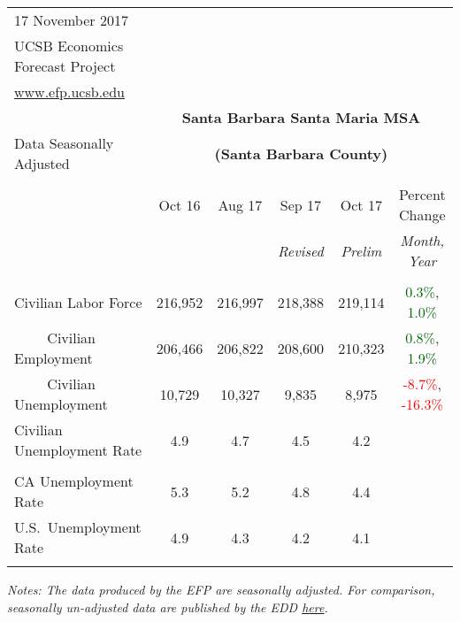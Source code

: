 \documentclass[12pt]{article}
\begin{document}
\begin{table}
\begin{tabular}{|l|c|c|c|c|c|}
\multicolumn{1}{l}{\small 17 November 2017} & \multicolumn{5}{c}{} \\
\multicolumn{1}{l}{\small UCSB Economics Forecast Project} & \multicolumn{5}{c}{} \\
\multicolumn{1}{l}{\small \href{http://www.efp.ucsb.edu/}{www.efp.ucsb.edu}} & \multicolumn{5}{c}{} \\
\multicolumn{1}{c}{} & \multicolumn{5}{c}{\large \textbf{Santa Barbara Santa Maria MSA}} \\
\multicolumn{1}{l}{\small Data Seasonally Adjusted} & \multicolumn{5}{c}{\small \textbf{(Santa Barbara County)}} \\ \hline \hline
& & & & & \\
 & Oct 16 & Aug 17 & Sep 17 & Oct 17 & Percent Change \\
 & & & \small \textit{Revised} & \small \textit{Prelim} & \small \textit{Month, Year} \\ \hline
& & & & & \\
Civilian Labor Force & 216,952 & 216,997 & 218,388 & 219,114 & \textcolor{darkgreen}{0.3\%}, \textcolor{darkgreen}{1.0\%} \\
$\qquad$ \small Civilian Employment & 206,466 & 206,822 & 208,600 & 210,323 & \textcolor{darkgreen}{0.8\%}, \textcolor{darkgreen}{1.9\%} \\
$\qquad$ \small Civilian Unemployment & 10,729 & 10,327 & 9,835 & 8,975 & \textcolor{red}{-8.7\%}, \textcolor{red}{-16.3\%} \\
Civilian Unemployment Rate & 4.9 & 4.7 & 4.5 & 4.2 & \\
& & & & & \\
CA Unemployment Rate & 5.3 & 5.2 & 4.8 & 4.4 & \\
U.S.\ Unemployment Rate & 4.9 & 4.3 & 4.2 & 4.1 & \\
& & & & & \\ \hline \hline
\end{tabular}
\par
\vspace{.5em}
\footnotesize
\textit{Notes: The data produced by the EFP are seasonally adjusted. For comparison, seasonally un-adjusted data are published by the EDD \href{http://www.labormarketinfo.ca.gov/file/lfmonth/satb$pds.pdf}{here}.}
\end{table}
\end{document}
